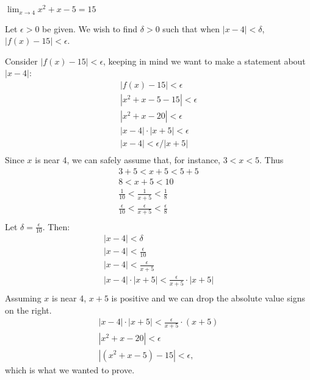 {$\displaystyle \lim_{x\to 4} x^2+x-5 = 15$}
{Let $\epsilon >0$ be given. We wish to find $\delta >0$ such that when $|x-4|<\delta$, $|f(x)-15|<\epsilon$. 

Consider $|f(x)-15|<\epsilon$, keeping in  mind we want to make a statement about $|x-4|$:
\begin{gather*}
|f(x) -15 | < \epsilon \\
|x^2+x-5 -15 |<\epsilon \\
| x^2+x-20 | < \epsilon \\
| x-4 |\cdot|x+5| < \epsilon \\
| x-4 | < \epsilon/|x+5| \\
\end{gather*}
Since $x$ is near 4, we can safely assume that, for instance, $3<x<5$. Thus
\begin{gather*}
3+5<x+5<5+5 \\
8 < x+5 < 10 \\
\frac{1}{10} < \frac{1}{x+5} < \frac{1}{8} \\
\frac{\epsilon}{10} < \frac{\epsilon}{x+5} < \frac{\epsilon}{8} \\
\end{gather*}
Let $\delta =\frac{\epsilon}{10}$. Then:
\begin{gather*}
|x-4|<\delta \\
|x-4| < \frac{\epsilon}{10}\\
|x-4| < \frac{\epsilon}{x+5}\\
|x-4|\cdot|x+5| < \frac{\epsilon}{x+5}\cdot|x+5|\\
\end{gather*}
Assuming $x$ is near 4, $x+5$ is positive and we can drop the absolute value signs on the right.
\begin{gather*}
|x-4|\cdot|x+5| < \frac{\epsilon}{x+5}\cdot(x+5)\\
|x^2+x-20| < \epsilon\\
|(x^2+x-5) -15| < \epsilon,
\end{gather*}
which is what we wanted to prove.
}



